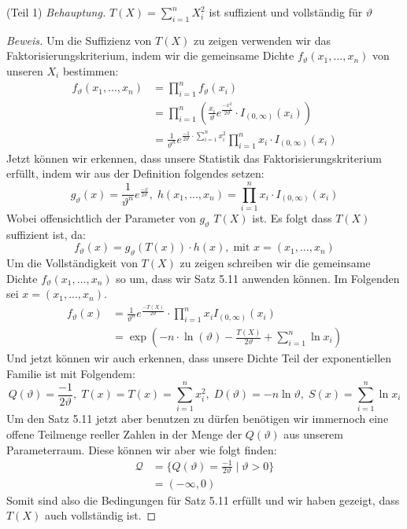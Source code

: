 \documentclass[a4paper]{article}
\newcommand{\beh}{\textit{Behauptung. }}
\newenvironment{Aufgabe}[2][Aufgabe]{\begin{trivlist}
\item[\hskip \labelsep {\bfseries #1}\hskip \labelsep {\bfseries #2.}]}{\end{trivlist}}
\begin{document}
\begin{theorem} %
\begin{Aufgabe}{2} %
\end{Aufgabe}

(Teil 1)
\beh $T(X) = \sum_{i=1}^{n} X_i ^2$ ist suffizient und vollständig für $\vartheta$

\begin{proof}[Beweis]
	Um die Suffizienz von $T(X)$ zu zeigen verwenden wir das Faktorisierungskriterium,
	indem wir die gemeinsame Dichte $f_\vartheta (x_1, ..., x_{n})$ von unseren
	$X_i$ bestimmen:
	\begin{align*}
		f_\vartheta (x_1, ..., x_{n}) &= \prod_{i=1}^{n} f_\vartheta (x_{i}) \\
				  &= \prod_{i=1}^{n} \left(
				  	\frac{ x_{i} }{ \vartheta } e ^{\frac{ - x_{i} ^2 }{ 2 \vartheta }}
					\cdot I_{ ( 0, \infty ) } (x_{i}) 
				  \right) \\
				  &= \frac{ 1 }{ \vartheta ^{n} } e ^{ \frac{ - 1 }{ 2 \vartheta } \cdot 
				  \sum_{i=1}^{n} x_{i} ^2
			  }
			  \prod_{i=1}^{n} x_{i} \cdot I_{ ( 0, \infty ) } (x_{i})  
	\end{align*}
	Jetzt können wir erkennen, dass unsere Statistik das Faktorisierungskriterium erfüllt, indem wir
	aus der Definition folgendes setzen:
	\[
		g_\vartheta (x) = \frac{ 1 }{ \vartheta ^{n} } e ^{ \frac{ -x }{ 2 \vartheta } },
		\; h(x_1, ..., x_{n}) = \prod_{i=1}^{n} x_{i} \cdot I_{ ( 0, \infty ) } (x_{i})  
	\] 
	Wobei offensichtlich der Parameter von $g_\vartheta$ $T(X)$ ist. Es folgt dass $T(X)$ suffizient ist,
	da:
	\[
		f_\vartheta (x) = g_\vartheta (T(x)) \cdot h(x), \;
		\text{mit } x = (x_1, ..., x_{n})
	\] 
	Um die Vollständigkeit von $T(X)$ zu zeigen schreiben wir die gemeinsame Dichte
	$f_\vartheta(x_1, ..., x_{n})$ so um, dass wir Satz 5.11 anwenden können. Im Folgenden
	sei $x = ( x_1 , ..., x_{n} )$.
	\begin{align*}
		f_\vartheta(x) &= \frac{ 1 }{ \vartheta ^{n} } e ^{ \frac{ - T(X) }{ 2 \vartheta } }
		\cdot \prod_{i=1}^{n} x_{i} I_{ ( 0, \infty ) } (x_{i}) \\
			   &= \exp \left(
				   - n \cdot \ln (\vartheta)
				   - \frac{ T(X) }{ 2 \vartheta }
				   + \sum_{i=1}^{n} \ln x_{i}
			   \right) 
	\end{align*}
	Und jetzt können wir auch erkennen, dass unsere Dichte Teil der exponentiellen Familie ist
	mit Folgendem:
	\[
		Q(\vartheta) = \frac{ -1 }{ 2 \vartheta }, \;
		T(x) = T(x) = \sum_{i=1}^{n} x_{i} ^2, \;
		D(\vartheta) = - n \ln \vartheta, \;
		S(x) = \sum_{i=1}^{n} \ln x_{i}
	\] 
	Um den Satz 5.11 jetzt aber benutzen zu dürfen benötigen wir immernoch eine offene Teilmenge
	reeller Zahlen in der Menge der $Q(\vartheta)$ aus unserem Parameterraum.
	Diese können wir aber wie folgt finden:
	\begin{align*}
		\mathcal{Q} &= \{
			Q(\vartheta) = \frac{ -1 }{ 2 \vartheta } \; \Big | \; \vartheta > 0
		\} \\
					&= (- \infty, 0)
	\end{align*}
	Somit sind also die Bedingungen für Satz 5.11 erfüllt und wir haben gezeigt, dass $T(X)$
	auch vollständig ist.
\end{proof}


\end{theorem}
\end{document}
